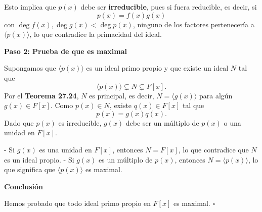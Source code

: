 Esto implica que \( p(x) \) debe ser \textbf{irreducible}, pues si fuera reducible, es decir, si  
\[
p(x) = f(x) g(x)
\]
con \( \deg f(x), \deg g(x) < \deg p(x) \), ninguno de los factores pertenecería a \( \langle p(x) \rangle \), lo que contradice la primacidad del ideal.

\smallskip

\textbf{Paso 2: Prueba de que es maximal}

Supongamos que \( \langle p(x) \rangle \) es un ideal primo propio y que existe un ideal \( N \) tal que  
\[
\langle p(x) \rangle \subsetneq N \subsetneq F[x].
\]  
Por el \textbf{Teorema 27.24}, \( N \) es principal, es decir, \( N = \langle g(x) \rangle \) para algún \( g(x) \in F[x] \). Como \( p(x) \in N \), existe \( q(x) \in F[x] \) tal que  
\[
p(x) = g(x) q(x).
\]
Dado que \( p(x) \) es irreducible, \( g(x) \) debe ser un múltiplo de \( p(x) \) o una unidad en \( F[x] \).

- Si \( g(x) \) es una unidad en \( F[x] \), entonces \( N = F[x] \), lo que contradice que \( N \) es un ideal propio.  
- Si \( g(x) \) es un múltiplo de \( p(x) \), entonces \( N = \langle p(x) \rangle \), lo que significa que \( \langle p(x) \rangle \) es maximal.

\smallskip

\textbf{Conclusión}

Hemos probado que todo ideal primo propio en \( F[x] \) es maximal. \(\square\)

